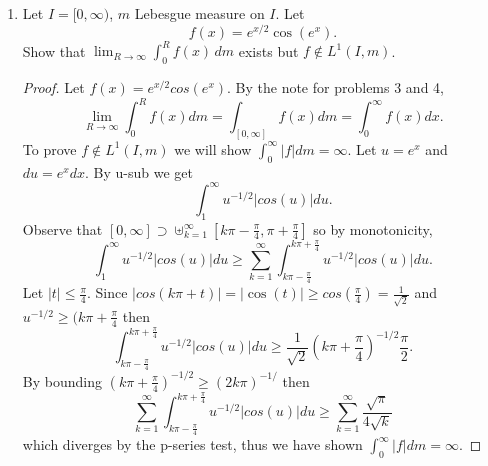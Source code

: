 \documentclass[11pt]{article}
\begin{document}
\begin{enumerate}[leftmargin=*, label=\textbf{\arabic*.}]
	\item Let $I = [0, \infty)$, $m$ Lebesgue measure on $I$. Let
	      \[
		      f(x) = e^{x/2} \cos(e^x).
	      \]
	      Show that $\displaystyle\lim_{R\to\infty} \int_0^R f(x)\, dm$ exists but $f \notin L^1(I, m)$.
	      \begin{proof}
		      Let $f(x) = e^{x/2}cos(e^x)$. By the note for problems 3 and 4,
		      $$ \lim_{R\to \infty} \int_0^R f(x) dm = \int_{[0,\infty]}f(x) dm = \int_0^\infty f(x)dx.$$
		      To prove $f \notin L^1(I,m)$ we will show $\int_0^\infty \vert f\vert dm = \infty.$ Let $u = e^x$ and $du = e^x dx$. By u-sub we get
		      $$ \int_1^\infty u^{-1/2}\vert cos(u)\vert du.$$ Observe that $[0,\infty] \supset \uplus_{k=1}^\infty [k\pi - \frac{\pi}{4}, \pi + \frac{\pi}{4}]$ so by monotonicity,
		      $$\int_1^\infty u^{-1/2}\vert cos(u) \vert du \geq \sum_{k=1}^\infty \int_{k\pi - \frac{\pi}{4}}^{k\pi+\frac{\pi}{4}} u^{-1/2}\vert cos(u) \vert du.$$
		      Let $\vert t \vert \leq \frac{\pi}{4}$. Since $\vert cos(k\pi + t)\vert = \vert \cos(t)\vert \geq cos(\frac{\pi}{4}) = \frac{1}{\sqrt{2}}$ and $u^{-1/2} \geq (k\pi + \frac{\pi}{4}$ then
		      $$ \int_{k\pi - \frac{\pi}{4}}^{k\pi+\frac{\pi}{4}} u^{-1/2}\vert cos(u) \vert du \geq \frac{1}{\sqrt{2}}(k\pi + \frac{\pi}{4})^{-1/2} \frac{\pi}{2}.$$ By bounding $(k\pi + \frac{\pi}{4})^{-1/2} \geq (2k\pi)^{-1/}$ then
		      $$\sum_{k=1}^\infty \int_{k\pi - \frac{\pi}{4}}^{k\pi+\frac{\pi}{4}} u^{-1/2}\vert cos(u) \vert du \geq \sum_{k=1}^\infty \frac{\sqrt{\pi}}{4\sqrt{k}}$$
		      which diverges by the p-series test, thus we have shown $\int_0^\infty \vert f\vert dm = \infty.$


	      \end{proof}


\end{enumerate}
\end{document}
